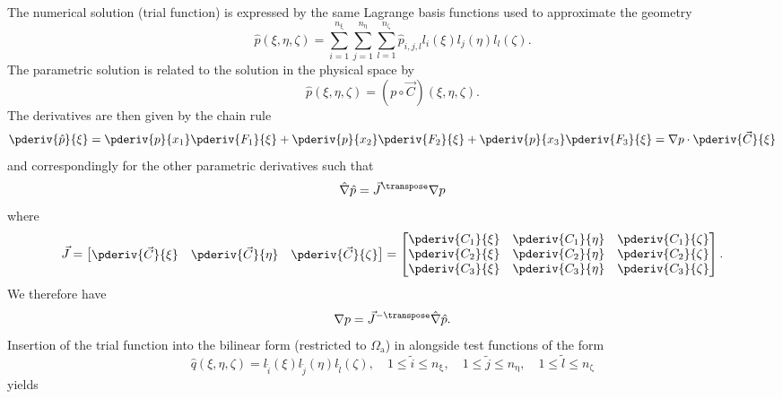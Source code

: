 The numerical solution (trial function) is expressed by the same Lagrange basis functions used to approximate the geometry
\begin{equation*}
	\hat{p}(\xi,\eta,\zeta) = \sum_{i=1}^{n_\upxi}\sum_{j=1}^{n_\upeta}\sum_{l=1}^{n_\upzeta}\hat{p}_{i,j,l} l_i(\xi)l_j(\eta)l_l(\zeta).
\end{equation*}
The parametric solution is related to the solution in the physical space by
\begin{equation*}
	\hat{p}(\xi,\eta,\zeta) = (p\circ \vec{C})(\xi,\eta,\zeta).
\end{equation*}
The derivatives are then given by the chain rule
\begin{equation*}
	\pderiv{\hat{p}}{\xi} = \pderiv{p}{x_1}\pderiv{F_1}{\xi} + \pderiv{p}{x_2}\pderiv{F_2}{\xi} + \pderiv{p}{x_3}\pderiv{F_3}{\xi} = \nabla p\cdot \pderiv{\vec{C}}{\xi}
\end{equation*}
and correspondingly for the other parametric derivatives such that
\begin{equation*}
	\hat{\nabla}\hat{p} = \vec{J}^\transpose\nabla p
\end{equation*}
where
\begin{equation*}
	\vec{J} = \begin{bmatrix}
		\pderiv{\vec{C}}{\xi} & \pderiv{\vec{C}}{\eta} & \pderiv{\vec{C}}{\zeta}
	\end{bmatrix} = \begin{bmatrix}
		\pderiv{C_1}{\xi} & \pderiv{C_1}{\eta} & \pderiv{C_1}{\zeta}\\
		\pderiv{C_2}{\xi} & \pderiv{C_2}{\eta} & \pderiv{C_2}{\zeta}\\
		\pderiv{C_3}{\xi} & \pderiv{C_3}{\eta} & \pderiv{C_3}{\zeta}
	\end{bmatrix}.
\end{equation*}
We therefore have
\begin{equation*}
	\nabla p = \vec{J}^{-\transpose}\hat{\nabla}\hat{p}.
\end{equation*}
Insertion of the trial function into the bilinear form (restricted to $\Omega_{\mathrm{a}}$) in  alongside test functions of the form
\begin{equation*}
	\hat{q}(\xi,\eta,\zeta) = l_{\tilde{i}}(\xi)l_{\tilde{j}}(\eta)l_{\tilde{l}}(\zeta),\quad 1\leq \tilde{i}\leq n_\upxi, \quad 1\leq \tilde{j}\leq n_\upeta, \quad 1\leq \tilde{l}\leq n_\upzeta
\end{equation*}
yields

